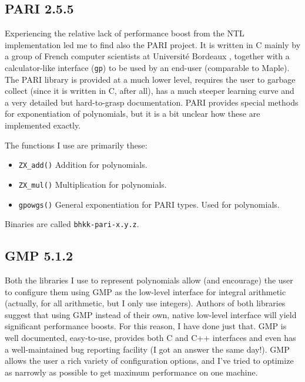 \documentclass[a4paper]{article}
\newcommand{\code}{\texttt}
\begin{document}
\subsection{PARI 2.5.5}
Experiencing the relative lack of performance boost from the NTL implementation led me to find also the PARI project. It is written in C mainly by a group of French computer scientists at Université Bordeaux \cite{pari}, together with a calculator-like interface (\code{gp}) to be used by an end-user (comparable to Maple). The PARI library is provided at a much lower level, requires the user to garbage collect (since it is written in C, after all), has a much steeper learning curve and a very detailed but hard-to-grasp documentation. PARI provides special methods for exponentiation of polynomials, but it is a bit unclear how these are implemented exactly.

The functions I use are primarily these: 

\begin{itemize}
 \item \code{ZX\_add()}
 \subitem Addition for polynomials. %
 \item \code{ZX\_mul()}
 \subitem Multiplication for polynomials. %
 \item \code{gpowgs()}
 \subitem General exponentiation for PARI types. Used for polynomials.
\end{itemize}

Binaries are called \code{bhkk-pari-x.y.z}.



\subsection{GMP 5.1.2}
Both the libraries I use to represent polynomials allow (and encourage) the user to configure them using GMP\cite{gmp} as the low-level interface for integral arithmetic (actually, for all arithmetic, but I only use integers). Authors of both libraries suggest that using GMP instead of their own, native low-level interface will yield significant performance boosts. For this reason, I have done just that. GMP is well documented, easy-to-use, provides both C and C++ interfaces and even has a well-maintained bug reporting facility (I got an answer the same day!). GMP allows the user a rich variety of configuration options, and I've tried to optimize as narrowly as possible to get maximum performance on one machine.
\end{document}
